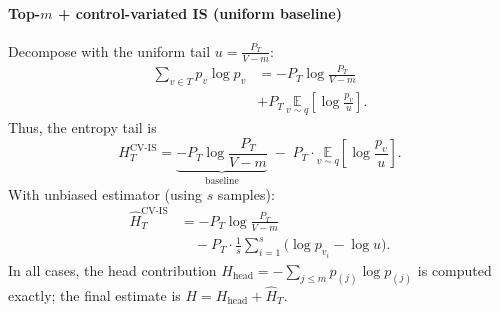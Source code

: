 \documentclass[11pt]{article}
\begin{document}
\paragraph{Top-$m$ + control-variated IS (uniform baseline)}
Decompose with the uniform tail $u=\tfrac{P_T}{V-m}$:
\begin{align*}
	\sum_{v\in T} p_v \log p_v
	 & = -P_T\log\!\frac{P_T}{V-m}                                              \\
	 & + P_T\,\underset{v\sim q}{\mathbb{E}}\!\left[\log\!\frac{p_v}{u}\right].
\end{align*}
Thus, the entropy tail is
\[
	H_T^{\text{CV-IS}}
	= \underbrace{-P_T\log\!\frac{P_T}{V-m}}_{\text{baseline}}
	\;-\; P_T \cdot \underset{v\sim q}{\mathbb{E}}\!\left[\log\!\frac{p_v}{u}\right].
\]
With unbiased estimator (using $s$ samples):
\begin{align*}
	\widehat{H}_T^{\text{CV-IS}}
	 & = -P_T\log\!\frac{P_T}{V-m}                                                \\
	 & \quad - P_T \cdot \frac{1}{s}\sum_{i=1}^s \Big(\log p_{v_i} - \log u\Big).
\end{align*}
In all cases, the head contribution $H_{\text{head}}=-\sum_{j\le m}p_{(j)}\log p_{(j)}$ is computed exactly; the final estimate is $H=H_{\text{head}}+\widehat{H}_T$.
\end{document}
